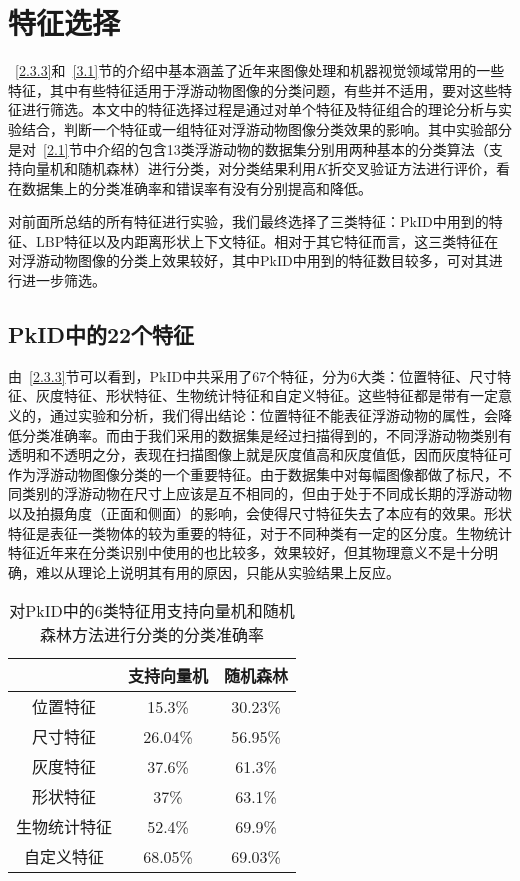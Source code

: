 \section{特征选择}

~\ref{2.3.3}和~\ref{3.1}节的介绍中基本涵盖了近年来图像处理和机器视觉领域常用的一些特征，其中有些特征适用于浮游动物图像的分类问题，有些并不适用，要对这些特征进行筛选。本文中的特征选择过程是通过对单个特征及特征组合的理论分析与实验结合，判断一个特征或一组特征对浮游动物图像分类效果的影响。其中实验部分是对~\ref{2.1}节中介绍的包含13类浮游动物的数据集分别用两种基本的分类算法（支持向量机和随机森林）进行分类，对分类结果利用$K$折交叉验证方法进行评价，看在数据集上的分类准确率和错误率有没有分别提高和降低。

对前面所总结的所有特征进行实验，我们最终选择了三类特征：PkID中用到的特征、LBP特征以及内距离形状上下文特征。相对于其它特征而言，这三类特征在对浮游动物图像的分类上效果较好，其中PkID中用到的特征数目较多，可对其进行进一步筛选。

\subsection{PkID中的22个特征}

由~\ref{2.3.3}节可以看到，PkID中共采用了67个特征，分为6大类：位置特征、尺寸特征、灰度特征、形状特征、生物统计特征和自定义特征。这些特征都是带有一定意义的，通过实验和分析，我们得出结论：位置特征不能表征浮游动物的属性，会降低分类准确率。而由于我们采用的数据集是经过扫描得到的，不同浮游动物类别有透明和不透明之分，表现在扫描图像上就是灰度值高和灰度值低，因而灰度特征可作为浮游动物图像分类的一个重要特征。由于数据集中对每幅图像都做了标尺，不同类别的浮游动物在尺寸上应该是互不相同的，但由于处于不同成长期的浮游动物以及拍摄角度（正面和侧面）的影响，会使得尺寸特征失去了本应有的效果。形状特征是表征一类物体的较为重要的特征，对于不同种类有一定的区分度。生物统计特征近年来在分类识别中使用的也比较多，效果较好，但其物理意义不是十分明确，难以从理论上说明其有用的原因，只能从实验结果上反应。

\begin{table}[ht]
\centering
\caption{对PkID中的6类特征用支持向量机和随机森林方法进行分类的分类准确率}
\begin{tabular}{|c|c|c|}
\hline
& 支持向量机 & 随机森林 \\
\hline
位置特征 & 15.3\% & 30.23\% \\
\hline
尺寸特征 & 26.04\% & 56.95\% \\
\hline
灰度特征 & 37.6\% & 61.3\% \\
\hline
形状特征 & 37\% & 63.1\% \\
\hline
生物统计特征 & 52.4\% & 69.9\% \\ 
\hline
自定义特征 & 68.05\% & 69.03\% \\
\hline
\end{tabular}
\label{PkID-6}
\end{table}

